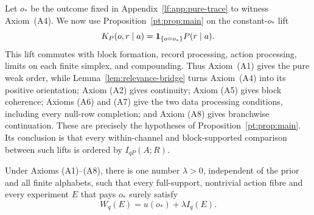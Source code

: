 Let $o_\ast$ be the outcome fixed in Appendix~\ref{lf:app:pure-trace} to
witness Axiom~\textup{(A4)}.  We now use Proposition~\ref{pt:prop:main} on the
constant-$o_\ast$ lift
\[
K_P(o,r\mid a)=\mathbf 1_{\{o=o_\ast\}}P(r\mid a).
\]
This lift commutes with block formation, record processing, action processing,
limits on each finite simplex, and compounding.  Thus Axiom~\textup{(A1)} gives
the pure weak order, while Lemma~\ref{lem:relevance-bridge} turns
Axiom~\textup{(A4)} into its positive orientation; Axiom \textup{(A2)} gives continuity; Axiom \textup{(A5)} gives
block coherence; Axioms \textup{(A6)} and \textup{(A7)} give the two data
processing conditions, including every null-row completion; and Axiom
\textup{(A8)} gives branchwise continuation.  These are precisely the
hypotheses of Proposition~\ref{pt:prop:main}.  Its conclusion is that every
within-channel and block-supported comparison between such lifts is ordered by
$I_{qP}(A;R)$.

\begin{lemma}\label{lf:lem:trace-scale}
Under Axioms \textup{(A1)--(A8)}, there is one number $\lambda>0$, independent
of the prior and all finite alphabets, such that every full-support,
nontrivial action fibre and every experiment $E$ that pays $o_\ast$ surely satisfy
\begin{equation}
W_q(E)=u(o_\ast)+\lambda I_q(E).
\label{lf:eq:sure-anchor}
\end{equation}
\end{lemma}

